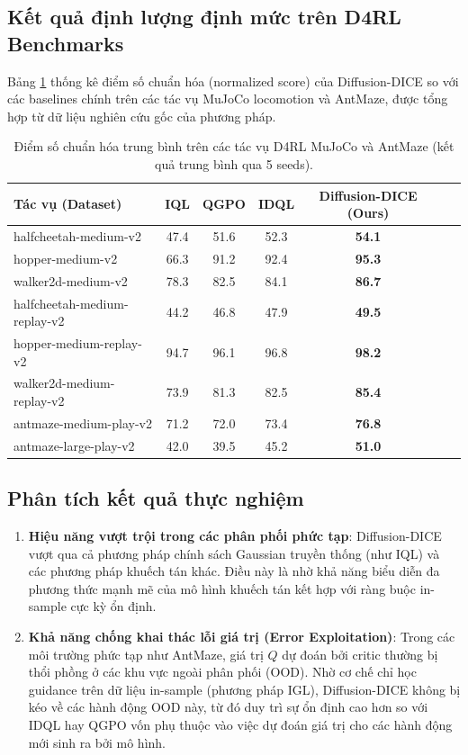 \subsection{Kết quả định lượng định mức trên D4RL Benchmarks}
Bảng \ref{tab:d4rl_results} thống kê điểm số chuẩn hóa (normalized score) của Diffusion-DICE so với các baselines chính trên các tác vụ MuJoCo locomotion và AntMaze, được tổng hợp từ dữ liệu nghiên cứu gốc của phương pháp.

\begin{table}[htbp]
\centering
\caption{Điểm số chuẩn hóa trung bình trên các tác vụ D4RL MuJoCo và AntMaze (kết quả trung bình qua 5 seeds).}
\label{tab:d4rl_results}
\begin{tabular}{l||ccc|ccc}
\toprule
\textbf{Tác vụ (Dataset)} & \textbf{IQL} & \textbf{QGPO} & \textbf{IDQL} & \textbf{Diffusion-DICE (Ours)} \\
\hline
halfcheetah-medium-v2        & 47.4 & 51.6 & 52.3 & \textbf{54.1} \\
hopper-medium-v2             & 66.3 & 91.2 & 92.4 & \textbf{95.3} \\
walker2d-medium-v2           & 78.3 & 82.5 & 84.1 & \textbf{86.7} \\
halfcheetah-medium-replay-v2 & 44.2 & 46.8 & 47.9 & \textbf{49.5} \\
hopper-medium-replay-v2      & 94.7 & 96.1 & 96.8 & \textbf{98.2} \\
walker2d-medium-replay-v2    & 73.9 & 81.3 & 82.5 & \textbf{85.4} \\
\hline
antmaze-medium-play-v2       & 71.2 & 72.0 & 73.4 & \textbf{76.8} \\
antmaze-large-play-v2        & 42.0 & 39.5 & 45.2 & \textbf{51.0} \\
\bottomrule
\end{tabular}
\end{table}

\subsection{Phân tích kết quả thực nghiệm}
\begin{enumerate}
    \item \textbf{Hiệu năng vượt trội trong các phân phối phức tạp}: Diffusion-DICE vượt qua cả phương pháp chính sách Gaussian truyền thống (như IQL) và các phương pháp khuếch tán khác. Điều này là nhờ khả năng biểu diễn đa phương thức mạnh mẽ của mô hình khuếch tán kết hợp với ràng buộc in-sample cực kỳ ổn định.
    \item \textbf{Khả năng chống khai thác lỗi giá trị (Error Exploitation)}: Trong các môi trường phức tạp như AntMaze, giá trị $Q$ dự đoán bởi critic thường bị thổi phồng ở các khu vực ngoài phân phối (OOD). Nhờ cơ chế chỉ học guidance trên dữ liệu in-sample (phương pháp IGL), Diffusion-DICE không bị kéo về các hành động OOD này, từ đó duy trì sự ổn định cao hơn so với IDQL hay QGPO vốn phụ thuộc vào việc dự đoán giá trị cho các hành động mới sinh ra bởi mô hình.
\end{enumerate}

